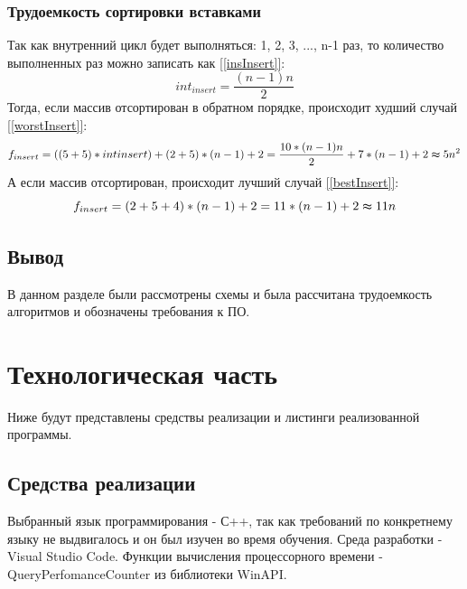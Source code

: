 \documentclass{article}
\begin{document}
	\subsubsection{Трудоемкость сортировки вставками}
		Так как внутренний цикл будет выполняться: 1, 2, 3, ..., n-1 раз, то количество выполненных раз можно записать как \hyperref[insInsert]{[\ref{insInsert}]}:
\begin{equation}\label{insInsert}
	int_{insert}=\frac{(n-1)n}{2}
\end{equation}
	Тогда, если массив отсортирован в обратном порядке, происходит худший случай \hyperref[worstInsert]{[\ref{worstInsert}]}:
	\begin{equation}\label{worstInsert}
		f_{insert} = ((5 + 5) * int{insert}) + (2 + 5) * (n - 1) + 2 =
		 \frac{10 * (n-1)n}{2} + 7 * (n - 1) + 2 \thickapprox 5n^2
	\end{equation}
	А если массив отсортирован, происходит лучший случай \hyperref[bestInsert]{[\ref{bestInsert}]}:
	\begin{equation}\label{bestInsert}
		f_{insert} = (2 + 5 + 4) * (n - 1) + 2 = 11 * (n - 1) + 2 \thickapprox 11n
	\end{equation}

	\subsection{Вывод}
	В данном разделе были рассмотрены схемы и была рассчитана трудоемкость алгоритмов и обозначены требования к ПО.
	
	\newpage
	\section{Технологическая часть}
	Ниже будут представлены средствы реализации и листинги реализованной программы.
	\subsection{Средcтва реализации}
	Выбранный язык программирования - С++, так как требований по конкретнему языку не выдвигалось и он был изучен во время обучения. Среда разработки - Visual Studio Code.\cite{vs-code}
	\newline
	\indent Функции вычисления процессорного времени - QueryPerfomanceCounter из библиотеки WinAPI.\cite{winapi}
	
\end{document}

